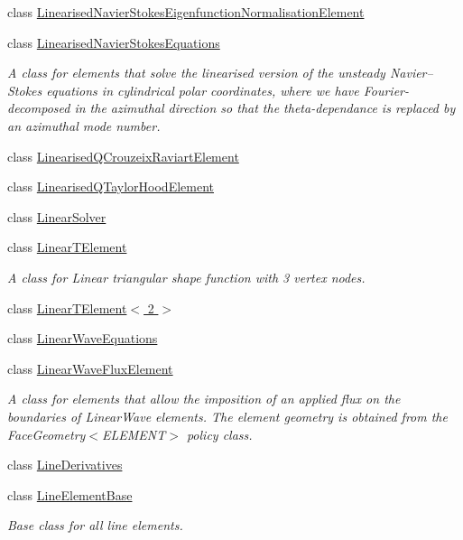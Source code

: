 \begin{DoxyCompactItemize}
class \hyperlink{classoomph_1_1LinearisedNavierStokesEigenfunctionNormalisationElement}{Linearised\+Navier\+Stokes\+Eigenfunction\+Normalisation\+Element}
\item 
class \hyperlink{classoomph_1_1LinearisedNavierStokesEquations}{Linearised\+Navier\+Stokes\+Equations}
\begin{DoxyCompactList}\small\item\em A class for elements that solve the linearised version of the unsteady Navier--Stokes equations in cylindrical polar coordinates, where we have Fourier-\/decomposed in the azimuthal direction so that the theta-\/dependance is replaced by an azimuthal mode number. \end{DoxyCompactList}\item 
class \hyperlink{classoomph_1_1LinearisedQCrouzeixRaviartElement}{Linearised\+Q\+Crouzeix\+Raviart\+Element}
\item 
class \hyperlink{classoomph_1_1LinearisedQTaylorHoodElement}{Linearised\+Q\+Taylor\+Hood\+Element}
\item 
class \hyperlink{classoomph_1_1LinearSolver}{Linear\+Solver}
\item 
class \hyperlink{classoomph_1_1LinearTElement}{Linear\+T\+Element}
\begin{DoxyCompactList}\small\item\em A class for Linear triangular shape function with 3 vertex nodes. \end{DoxyCompactList}\item 
class \hyperlink{classoomph_1_1LinearTElement_3_012_01_4}{Linear\+T\+Element$<$ 2 $>$}
\item 
class \hyperlink{classoomph_1_1LinearWaveEquations}{Linear\+Wave\+Equations}
\item 
class \hyperlink{classoomph_1_1LinearWaveFluxElement}{Linear\+Wave\+Flux\+Element}
\begin{DoxyCompactList}\small\item\em A class for elements that allow the imposition of an applied flux on the boundaries of Linear\+Wave elements. The element geometry is obtained from the Face\+Geometry$<$\+E\+L\+E\+M\+E\+N\+T$>$ policy class. \end{DoxyCompactList}\item 
class \hyperlink{classoomph_1_1LineDerivatives}{Line\+Derivatives}
\item 
class \hyperlink{classoomph_1_1LineElementBase}{Line\+Element\+Base}
\begin{DoxyCompactList}\small\item\em Base class for all line elements. \end{DoxyCompactList}\item 

\end{DoxyCompactItemize}
